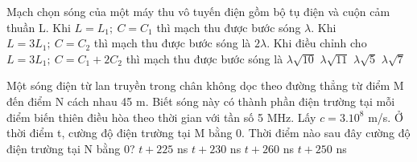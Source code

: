 \begin{vidu} %
Mạch chọn sóng của một máy thu vô tuyến điện gồm bộ tụ điện và cuộn cảm thuần L. Khi $L = L_1;\ C = C_1$ thì mạch thu được bước sóng $\lambda$. Khi $L = 3L_1;\ C = C_2$ thì mạch thu được bước sóng là $2\lambda$. Khi điều chỉnh cho $L = 3L_1;\ C = C_1 + 2C_2$ thì mạch thu được bước sóng là
\choice
{$\lambda\sqrt{10}$}
{\True $\lambda\sqrt{11}$}
{$\lambda\sqrt{5}$}
{$\lambda\sqrt{7}$}
\end{vidu}
\begin{vidu} %
 Một sóng điện từ lan truyền trong chân không dọc theo đường thẳng từ điểm M đến điểm N cách nhau 45 m. Biết sóng này có thành phần điện trường tại mỗi điểm biến thiên điều hòa theo thời gian với tần số 5 MHz. Lấy $c = 3.10^8$ m/s. Ở thời điểm t, cường độ điện trường tại M bằng 0. Thời điểm nào sau đây cường độ điện trường tại N bằng 0?
\choice
{$t + 225$ ns}
{$t + 230$ ns}
{$t + 260$ ns}
{\True $t + 250$ ns}
\end{vidu}
